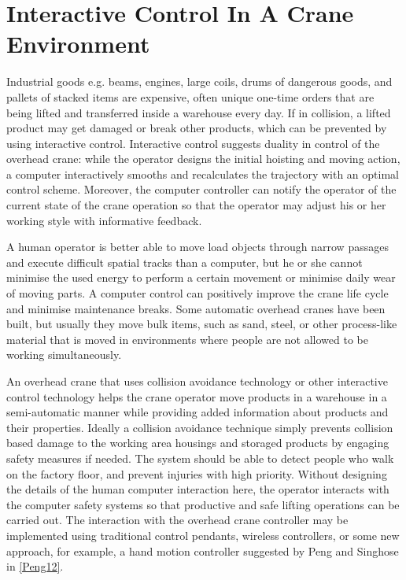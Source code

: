 \documentclass[12pt,a4paper,oneside,pdftex]{report}
\begin{document}
\section{Interactive Control In A Crane Environment}
\label{section:collision_control_in_a_crane_environment}

Industrial goods e.g. beams, engines, large coils, drums of dangerous goods, and pallets of stacked items are expensive, often unique one-time orders that are being lifted and transferred inside a warehouse every day. If in collision, a lifted product may get damaged or break other products, which can be prevented by using interactive control. Interactive control suggests duality in control of the overhead crane: while the operator designs the initial hoisting and moving action, a computer interactively smooths and recalculates the trajectory with an optimal control scheme. Moreover, the computer controller can notify the operator of the current state of the crane operation so that the operator may adjust his or her working style with informative feedback.

A human operator is better able to move load objects through narrow passages and execute difficult spatial tracks than a computer, but he or she cannot minimise the used energy to perform a certain movement or minimise daily wear of moving parts. A computer control can positively improve the crane life cycle and minimise maintenance breaks. 
Some automatic overhead cranes have been built, but usually they move bulk items, such as sand, steel, or other process-like material that is moved in environments where people are not allowed to be working simultaneously.

An overhead crane that uses collision avoidance technology or other interactive control technology helps the crane operator move products in a warehouse in a semi-automatic manner while providing added information about products and their properties. Ideally a collision avoidance technique simply prevents collision based damage to the working area housings and storaged products by engaging safety measures if needed. The system should be able to detect people who walk on the factory floor, and prevent injuries with high priority. Without designing the details of the human computer interaction here, the operator interacts with the computer safety systems so that productive and safe lifting operations can be carried out. The interaction with the overhead crane controller may be implemented using traditional control pendants, wireless controllers, or some new approach, for example, a hand motion controller suggested by Peng and Singhose in \ref{Peng12}.
\end{document}
